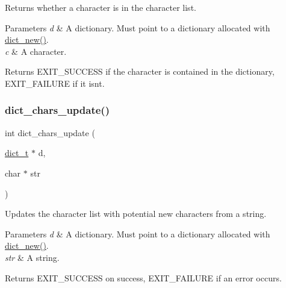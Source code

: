 Returns whether a character is in the character list. 


\begin{DoxyParams}{Parameters}
{\em d} & A dictionary. Must point to a dictionary allocated with \mbox{\hyperlink{structdict__t_a0074913fdba65680670bf93153225e2f}{dict\+\_\+new()}}. \\
\hline
{\em c} & A character. \\
\hline
\end{DoxyParams}
\begin{DoxyReturn}{Returns}
E\+X\+I\+T\+\_\+\+S\+U\+C\+C\+E\+SS if the character is contained in the dictionary, E\+X\+I\+T\+\_\+\+F\+A\+I\+L\+U\+RE if it isn\textquotesingle{}t. 
\end{DoxyReturn}
\mbox{\label{structdict__t_afb48275334e47ae9cab20e1837f0bbcf}} 
\subsubsection{\texorpdfstring{dict\+\_\+chars\+\_\+update()}{dict\_chars\_update()}}
{\footnotesize\ttfamily int dict\+\_\+chars\+\_\+update (\begin{DoxyParamCaption}\item[{\mbox{\hyperlink{structdict__t}{dict\+\_\+t}} $\ast$}]{d,  }\item[{char $\ast$}]{str }\end{DoxyParamCaption})}



Updates the character list with potential new characters from a string. 


\begin{DoxyParams}{Parameters}
{\em d} & A dictionary. Must point to a dictionary allocated with \mbox{\hyperlink{structdict__t_a0074913fdba65680670bf93153225e2f}{dict\+\_\+new()}}. \\
\hline
{\em str} & A string. \\
\hline
\end{DoxyParams}
\begin{DoxyReturn}{Returns}
E\+X\+I\+T\+\_\+\+S\+U\+C\+C\+E\+SS on success, E\+X\+I\+T\+\_\+\+F\+A\+I\+L\+U\+RE if an error occurs. 
\end{DoxyReturn}
\mbox{\label{structdict__t_ada2e9cd98e98ccefe871124833a4cd77}} 
